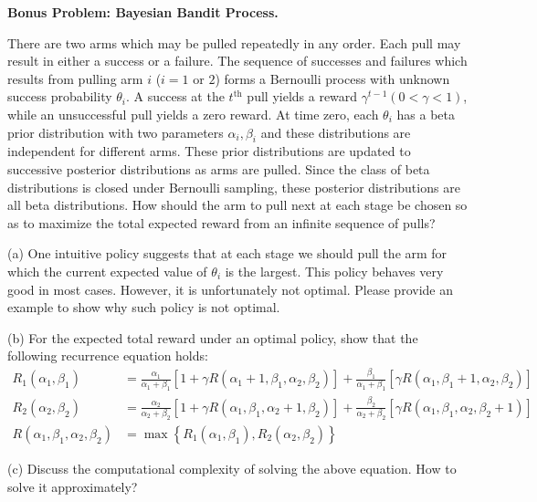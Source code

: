 \begin{homeworkProblem}

\textbf{Bonus Problem: Bayesian Bandit Process.}

There are two arms which may be pulled repeatedly in any order. Each pull may result in either a success or a failure. The sequence of successes and failures which results from pulling arm $i$ ($i=1$ or $2$) forms a Bernoulli process with unknown success probability $\theta_i$. A success at the $t^{\text{th}}$ pull yields a reward $\gamma^{t-1}(0<\gamma<1)$, while an unsuccessful pull yields a zero reward. At time zero, each $\theta_i$ has a beta prior distribution with two parameters $\alpha_i, \beta_i$ and these distributions are independent for different arms. These prior distributions are updated to successive posterior distributions as arms are pulled. Since the class of beta distributions is closed under Bernoulli sampling, these posterior distributions are all beta distributions. How should the arm to pull next at each stage be chosen so as to maximize the total expected reward from an infinite sequence of pulls?

(a) One intuitive policy suggests that at each stage we should pull the arm for which the current expected value of $\theta_i$ is the largest. This policy behaves very good in most cases. However, it is unfortunately not optimal. Please provide an example to show why such policy is not optimal.

(b) For the expected total reward under an optimal policy, show that the following recurrence equation holds:
\begin{align*}
R_1\left(\alpha_1, \beta_1\right) &= \frac{\alpha_1}{\alpha_1+\beta_1}\left[1+\gamma R\left(\alpha_1+1, \beta_1, \alpha_2, \beta_2\right)\right]+\frac{\beta_1}{\alpha_1+\beta_1}\left[\gamma R\left(\alpha_1, \beta_1+1, \alpha_2, \beta_2\right)\right] \\
R_2\left(\alpha_2, \beta_2\right) &= \frac{\alpha_2}{\alpha_2+\beta_2}\left[1+\gamma R\left(\alpha_1, \beta_1, \alpha_2+1, \beta_2\right)\right]+\frac{\beta_2}{\alpha_2+\beta_2}\left[\gamma R\left(\alpha_1, \beta_1, \alpha_2, \beta_2+1\right)\right] \\
R\left(\alpha_1, \beta_1, \alpha_2, \beta_2\right) &= \max \left\{R_1\left(\alpha_1, \beta_1\right), R_2\left(\alpha_2, \beta_2\right)\right\}
\end{align*}

(c) Discuss the computational complexity of solving the above equation. How to solve it approximately?


\end{homeworkProblem}
